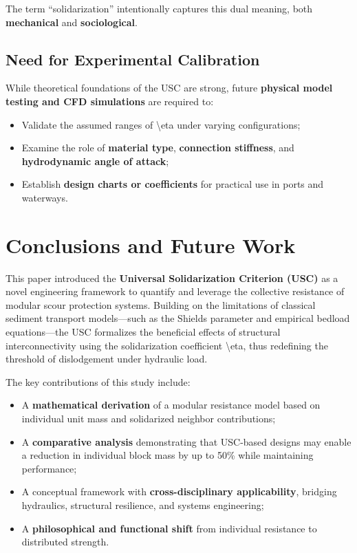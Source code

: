 \documentclass[Journal,letterpaper]{ascelike-new}
\begin{document}
The term ``solidarization'' intentionally captures this dual meaning, both \textbf{mechanical} and \textbf{sociological}.

\subsection{Need for Experimental Calibration}

While theoretical foundations of the USC are strong, future \textbf{physical model testing and CFD simulations} are required to:

\begin{itemize}
\item  Validate the assumed ranges of {\textbackslash}eta under varying configurations;

\item  Examine the role of \textbf{material type}, \textbf{connection stiffness}, and \textbf{hydrodynamic angle of attack};

\item  Establish \textbf{design charts or coefficients} for practical use in ports and waterways.
\end{itemize}


\section{Conclusions and Future Work}

This paper introduced the \textbf{Universal Solidarization Criterion (USC)} as a novel engineering framework to quantify and leverage the collective resistance of modular scour protection systems. Building on the limitations of classical sediment transport models---such as the Shields parameter and empirical bedload equations---the USC formalizes the beneficial effects of structural interconnectivity using the solidarization coefficient {\textbackslash}eta, thus redefining the threshold of dislodgement under hydraulic load.


The key contributions of this study include:

\begin{itemize}
\item  A \textbf{mathematical derivation} of a modular resistance model based on individual unit mass and solidarized neighbor contributions;

\item  A \textbf{comparative analysis} demonstrating that USC-based designs may enable a reduction in individual block mass by up to 50\% while maintaining performance;

\item  A conceptual framework with \textbf{cross-disciplinary applicability}, bridging hydraulics, structural resilience, and systems engineering;

\item  A \textbf{philosophical and functional shift} from individual resistance to distributed strength.
\end{itemize}
\end{document}
